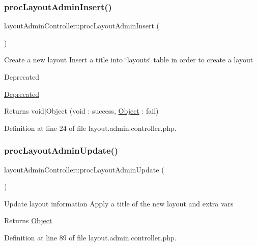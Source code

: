 \subsubsection{\texorpdfstring{proc\+Layout\+Admin\+Insert()}{procLayoutAdminInsert()}}
{\footnotesize\ttfamily layout\+Admin\+Controller\+::proc\+Layout\+Admin\+Insert (\begin{DoxyParamCaption}{ }\end{DoxyParamCaption})}

Create a new layout Insert a title into \char`\"{}layouts\char`\"{} table in order to create a layout \begin{DoxyRefDesc}{Deprecated}
\item[\hyperlink{deprecated__deprecated000015}{Deprecated}]\end{DoxyRefDesc}
\begin{DoxyReturn}{Returns}
void$\vert$\+Object (void \+: success, \hyperlink{classObject}{Object} \+: fail) 
\end{DoxyReturn}


Definition at line 24 of file layout.\+admin.\+controller.\+php.

\hypertarget{classlayoutAdminController_a897057011913af6cb2740d8460544119}{}\label{classlayoutAdminController_a897057011913af6cb2740d8460544119} 
\subsubsection{\texorpdfstring{proc\+Layout\+Admin\+Update()}{procLayoutAdminUpdate()}}
{\footnotesize\ttfamily layout\+Admin\+Controller\+::proc\+Layout\+Admin\+Update (\begin{DoxyParamCaption}{ }\end{DoxyParamCaption})}

Update layout information Apply a title of the new layout and extra vars \begin{DoxyReturn}{Returns}
\hyperlink{classObject}{Object} 
\end{DoxyReturn}


Definition at line 89 of file layout.\+admin.\+controller.\+php.

\hypertarget{classlayoutAdminController_a91dcd0368a7a3f85b2047d0d2546f14b}{}\label{classlayoutAdminController_a91dcd0368a7a3f85b2047d0d2546f14b} 
